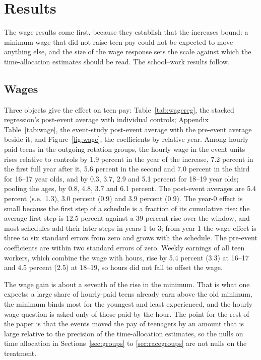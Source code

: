 \documentclass[12pt]{article}
\begin{document}
\section{Results}\label{sec:results}

The wage results come first, because they establish that the increases bound: a minimum wage that did not raise teen pay could not be expected to move anything else, and the size of the wage response sets the scale against which the time-allocation estimates should be read. The school--work results follow.

\subsection{Wages}

Three objects give the effect on teen pay: Table~\ref{tab:wagereg}, the stacked regression's post-event average with individual controls; Appendix Table~\ref{tab:wage}, the event-study post-event average with the pre-event average beside it; and Figure~\ref{fig:wage}, the coefficients by relative year. Among hourly-paid teens in the outgoing rotation groups, the hourly wage in the event units rises relative to controls by 1.9 percent in the year of the increase, 7.2 percent in the first full year after it, 5.6 percent in the second and 7.0 percent in the third for 16--17 year olds, and by 0.3, 3.7, 2.9 and 5.1 percent for 18--19 year olds; pooling the ages, by 0.8, 4.8, 3.7 and 6.1 percent. The post-event averages are 5.4 percent (s.e.\ 1.3), 3.0 percent (0.9) and 3.9 percent (0.9). The year-0 effect is small because the first step of a schedule is a fraction of its cumulative rise: the average first step is 12.5 percent against a 39 percent rise over the window, and most schedules add their later steps in years 1 to 3; from year 1 the wage effect is three to six standard errors from zero and grows with the schedule. The pre-event coefficients are within two standard errors of zero. Weekly earnings of all teen workers, which combine the wage with hours, rise by 5.4 percent (3.3) at 16--17 and 4.5 percent (2.5) at 18--19, so hours did not fall to offset the wage.

The wage gain is about a seventh of the rise in the minimum. That is what one expects: a large share of hourly-paid teens already earn above the old minimum, the minimum binds most for the youngest and least experienced, and the hourly wage question is asked only of those paid by the hour. The point for the rest of the paper is that the events moved the pay of teenagers by an amount that is large relative to the precision of the time-allocation estimates, so the nulls on time allocation in Sections~\ref{sec:groups} to \ref{sec:racegroups} are not nulls on the treatment.
\end{document}
